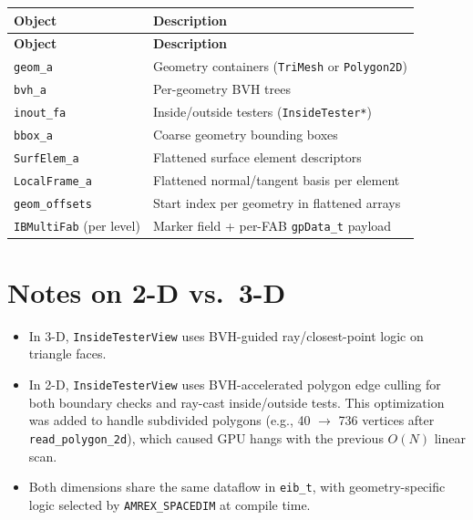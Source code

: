 \documentclass[11pt,a4paper]{article}
\begin{document}
\renewcommand{\arraystretch}{1.2}
\begin{longtable}{@{}L{4.5cm}L{9cm}@{}}
\toprule
\textbf{Object} & \textbf{Description} \\
\midrule
\endfirsthead
\toprule
\textbf{Object} & \textbf{Description} \\
\midrule
\endhead
\texttt{geom\_a}        & Geometry containers (\texttt{TriMesh} or \texttt{Polygon2D}) \\
\texttt{bvh\_a}         & Per-geometry BVH trees \\
\texttt{inout\_fa}      & Inside/outside testers (\texttt{InsideTester*}) \\
\texttt{bbox\_a}        & Coarse geometry bounding boxes \\
\texttt{SurfElem\_a}    & Flattened surface element descriptors \\
\texttt{LocalFrame\_a}  & Flattened normal/tangent basis per element \\
\texttt{geom\_offsets}  & Start index per geometry in flattened arrays \\
\texttt{IBMultiFab} (per level) & Marker field + per-FAB \texttt{gpData\_t} payload \\
\bottomrule
\end{longtable}

\section{Notes on 2-D vs.\ 3-D}

\begin{itemize}[nosep]
  \item In 3-D, \texttt{InsideTesterView} uses BVH-guided ray/closest-point logic on
        triangle faces.
  \item In 2-D, \texttt{InsideTesterView} uses BVH-accelerated polygon edge culling for
        both boundary checks and ray-cast inside/outside tests.
        This optimization was added to handle subdivided polygons
        (e.g., 40 $\to$ 736 vertices after \texttt{read\_polygon\_2d}), which caused
        GPU hangs with the previous $O(N)$ linear scan.
  \item Both dimensions share the same dataflow in \texttt{eib\_t}, with
        geometry-specific logic selected by \texttt{AMREX\_SPACEDIM} at compile time.
\end{itemize}
\end{document}
